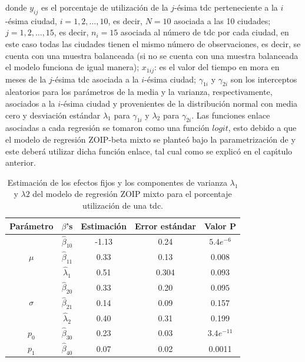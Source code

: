 donde $y_{ij}$ es el porcentaje de utilizaci\'{o}n de la $j$-\'{e}sima tdc perteneciente a la $i$-\'{e}sima ciudad, $i=1,2,\ldots, 10$, es decir, $N=10$ asociada a las 10 ciudades; $j=1,2,\ldots, 15$, es decir, $n_i=15$ asociada al n\'{u}mero de tdc por cada ciudad, en este caso todas las ciudades tienen el mismo n\'{u}mero de observaciones, es decir, se cuenta con una muestra balanceada (si no se cuenta con una muestra balanceada el modelo funciona de igual manera); $x_{1ij}$: es el valor del tiempo en mora en meses de la $j$-\'{e}sima tdc asociada a la $i$-\'{e}sima ciudad; $\gamma_{1i}$ y $\gamma_{2i}$ son los interceptos aleatorios para los par\'{a}metros de la media y la varianza, respectivamente, asociados a la $i$-\'{e}sima ciudad y provenientes de la distribuci\'{o}n normal con media cero y desviaci\'{o}n est\'{a}ndar $\lambda_1$ para $\gamma_{1i}$ y $\lambda_2$ para $\gamma_{2i}$. Las funciones enlace asociadas a cada regresi\'{o}n se tomaron como una funci\'{o}n $logit$, esto debido a que el modelo de regresi\'{o}n ZOIP-beta mixto se plante\'{o} bajo la parametrizaci\'{o}n de \cite{Stasinopoulos2} y este deber\'{a} utilizar dicha funci\'{o}n enlace, tal cual como se explic\'{o} en el cap\'{\i}tulo anterior.\\

\begin{table}[!hbt]
{\scriptsize
\begin{center}
\begin{tabular}{|c|c|ccc|}\hline
Par\'{a}metro & $\beta$'s & Estimaci\'{o}n & Error est\'{a}ndar & Valor P \\ \hline \hline
\multirow{3}{*}{$\mu$} & $\hat{\beta}_{10}$ & -1.13	&0.24	&$5.4e^{-6}$\\
& $\hat{\beta}_{11}$ & 0.33	&0.13	&0.008\\
& $\hat{\lambda}_1$ & 0.51	&0.304	&$0.093$ \\ \hline
\multirow{3}{*}{$\sigma$} & $\hat{\beta}_{20}$ & 0.33	&0.20	&$0.095$\\
& $\hat{\beta}_{21}$ & 0.14	&0.09	&0.157\\
& $\hat{\lambda}_2$ & 0.40	&0.31	&0.199 \\ \hline
$p_0$ & $\hat{\beta}_{30}$ & 0.23	&0.03	&$3.4e^{-11}$ \\ \hline
$p_1$ & $\hat{\beta}_{40}$ &0.07	&0.02	&0.0011 \\ \hline
\end{tabular}
\caption{Estimaci\'{o}n de los efectos fijos y los componentes de varianza $\lambda_1$ y $\lambda2$ del modelo de regresi\'{o}n ZOIP mixto para el porcentaje utilizaci\'{o}n de una tdc.}
\label{T_Apli_mix}
\end{center}
}
\end{table}

